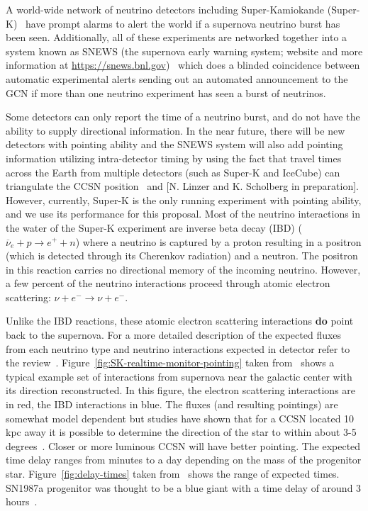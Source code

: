 \documentclass[12pt, letterpaper]{article}
\newcommand{\superk}  {Super\nobreakdash-K\xspace}
\begin{document}
A world-wide network of neutrino detectors including Super-Kamiokande
(\superk)~\cite{2003NIMPA.501..418F} have prompt alarms to alert the
world if a supernova neutrino burst has been seen.  Additionally, all
of these experiments are networked together into a system known as
SNEWS (the supernova early warning system; website and more
information at \url{https://snews.bnl.gov})~\cite{2004NJPh....6..114A}
which does a blinded coincidence between automatic experimental alerts
sending out an automated announcement to the GCN if more than one
neutrino experiment has seen a burst of neutrinos.

Some detectors can only report the time of a neutrino burst, and do
not have the ability to supply directional information.  In the near
future, there will be new detectors with pointing ability and the
SNEWS system will also add pointing information utilizing
intra-detector timing by using the fact that travel times across the
Earth from multiple detectors (such as \superk and IceCube) can
triangulate the CCSN position~\cite{2018JCAP...04..025B} and [N. Linzer
and K. Scholberg in preparation].  However, currently,
\superk is the only running experiment with pointing ability, and we
use its performance for this proposal. Most of the neutrino
interactions in the water of the \superk experiment are inverse beta
decay (IBD) ($ \overline{\nu}_{e}+ p \rightarrow e^{+} + n $) where a
neutrino is captured by a proton resulting in a positron (which is
detected through its Cherenkov radiation) and a neutron.  The positron
in this reaction carries no directional memory of the incoming
neutrino. However, a few percent of the neutrino interactions proceed
through atomic electron scattering:
$\nu + e^{-} \rightarrow \nu + e^{-} .$

Unlike the IBD reactions, these atomic electron scattering
interactions {\bf do} point back to the supernova.  For a more
detailed description of the expected fluxes from each neutrino type
and neutrino interactions expected in detector refer to the
review~\cite{2012ARNPS..62...81S}.
Figure~\ref{fig:SK-realtime-monitor-pointing} taken
from~\cite{2016APh....81...39A} shows a typical example set of
interactions from supernova near the galactic center with its
direction reconstructed.  In this figure, the electron scattering
interactions are in red, the IBD interactions in blue.  The fluxes
(and resulting pointings) are somewhat model dependent but studies
have shown that for a CCSN located 10 kpc away it is possible to
determine the direction of the star to within about 3-5
degrees~\cite{2016APh....81...39A}.  Closer or more luminous CCSN will
have better pointing.  The expected time delay ranges from minutes to
a day depending on the mass of the progenitor
star. Figure~\ref{fig:delay-times} taken
from~\cite{2013ApJ...778...81K} shows the range of expected times.
SN1987a progenitor was thought to be a blue giant with a time delay of
around 3 hours~\cite{ISAWTHISSOMWHERE}.
\end{document}
